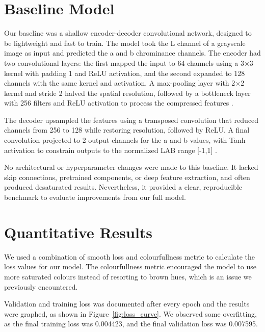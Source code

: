 \documentclass{article} %
\begin{document}
\section{Baseline Model}
\label{baseline}

Our baseline was a shallow encoder-decoder convolutional network, designed to be lightweight and fast to train. The model took the L channel of a grayscale image as input and predicted the a and b 
chrominance channels. The encoder had two convolutional layers: the first mapped the input to 64 channels using a 3$\times$3 kernel with padding 1 and ReLU activation, and the second expanded to 128 
channels with the same kernel and activation. A max-pooling layer with 2$\times$2 kernel and stride 2 halved the spatial resolution, followed by a bottleneck layer with 256 filters and ReLU activation 
to process the compressed features \citep{leatvanich2025image}.

The decoder upsampled the features using a transposed convolution that reduced channels from 256 to 128 while restoring resolution, followed by ReLU. A final convolution projected to 2 output channels 
for the a and b values, with Tanh activation to constrain outputs to the normalized LAB range [-1,1] \citep{rosebrock2019bwcolorization}.

No architectural or hyperparameter changes were made to this baseline. It lacked skip connections, pretrained components, or deep feature extraction, and often produced desaturated results. Nevertheless, 
it provided a clear, reproducible benchmark to evaluate improvements from our full model.

\section{Quantitative Results}
\label{quant_results}

We used a combination of smooth loss and colourfullness metric to calculate the loss values for our model. The colourfullness metric encouraged the model to use more saturated colours
instead of resorting to brown hues, which is an issue we previously encountered. 

Validation and training loss was documented after every epoch and the results were graphed, as shown in Figure~\ref{fig:loss_curve}. We observed some overfitting, as the final training loss was 0.004423, 
and the final validation loss was 0.007595.
\end{document}
